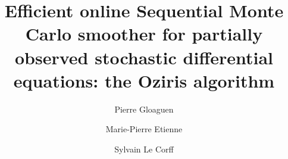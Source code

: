 \documentclass[12pt]{article}
\newcommand{\1}{\mathrm{1}}
\begin{document}
\author{Pierre Gloaguen\footnotemark[1] \and Marie-Pierre Etienne\footnotemark[1] \and Sylvain Le {C}orff\footnotemark[2]}
 


\title{Efficient online Sequential Monte Carlo smoother for partially observed stochastic differential equations: the Oziris algorithm}


\maketitle
\end{document}
